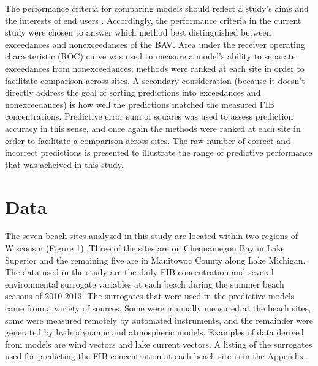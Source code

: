 \documentclass[authoryear,review, 12pt]{elsarticle}
\begin{document}
The performance criteria for comparing models should reflect a study's aims and the interests of end users \citep{Jakeman-Letcher-Norton-2006,Bennett-Croke-Guariso-Guillaume-Hamilton-Jakeman-Marsili-Libelli-Newham-Norton-Perrin-Pierce-Robson-Seppelt-Voinov-Fath-Andreassian-2013}. Accordingly, the performance criteria in the current study were chosen to answer which method best distinguished between exceedances and nonexceedances of the BAV. Area under the receiver operating characteristic (ROC) curve was used to measure a model's ability to separate exceedances from nonexceedances; methods were ranked at each site in order to facilitate comparison across sites. A secondary consideration (because it doesn't directly address the goal of sorting predictions into exceedances and nonexceedances) is how well the predictions matched the measured FIB concentrations. Predictive error sum of squares was used to assess prediction accuracy in this sense, and once again the methods were ranked at each site in order to facilitate a comparison across sites. The raw number of correct and incorrect predictions is presented to illustrate the range of predictive performance that was acheived in this study.

\section{Data}\label{data}

The seven beach sites analyzed in this study are located within two
 regions of Wisconsin (Figure 1). Three of the
sites are on Chequamegon Bay in Lake Superior and the remaining five are
in Manitowoc County along Lake Michigan. The data used in the study are the daily FIB concentration and several environmental surrogate variables at each beach during the summer beach seasons of 2010-2013. The surrogates that were used in the predictive models came from a variety of sources. Some were manually measured at the beach sites, some were measured remotely by automated instruments, and the remainder were generated by hydrodynamic and atmospheric models. Examples of data derived from models are wind vectors and lake current vectors. A listing of the surrogates used for predicting the FIB concentration at each beach site is in the
Appendix.
\end{document}
